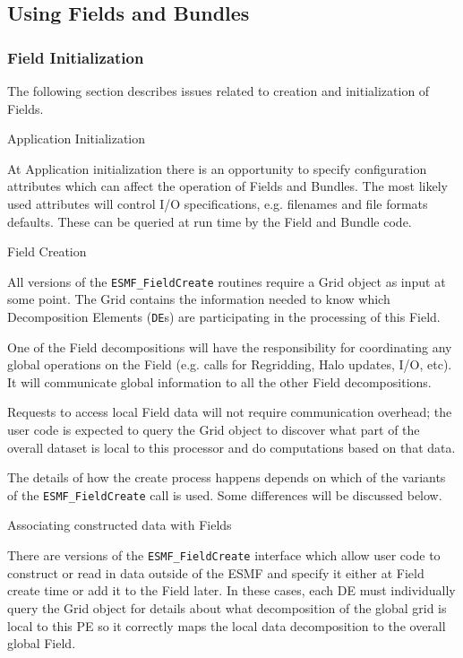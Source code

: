 \subsection{Using Fields and Bundles}

\subsubsection{Field Initialization}

The following section describes issues related to
creation and initialization of Fields.

\begin{description}

\item{Application Initialization}
 
At Application initialization there is an opportunity to 
specify configuration attributes which can affect the
operation of Fields and Bundles.  The most likely used
attributes will control I/O specifications, e.g. 
filenames and file formats defaults.  These can be
queried at run time by the Field and Bundle code.

\item{Field Creation}

All versions of the {\tt ESMF\_FieldCreate} 
routines require a Grid object as input at some point.
The Grid contains the information needed to know which 
Decomposition Elements ({\tt DE}s) are participating in 
the processing of this Field.  

One of the Field decompositions
will have the responsibility for coordinating
any global operations on the Field (e.g. calls for Regridding,
Halo updates, I/O, etc).  It will communicate global information
to all the other Field decompositions.

Requests to access local Field data will not require 
communication overhead; the user code is expected to
query the Grid object to discover what part of the
overall dataset is local to this processor and do
computations based on that data.

The details of how the create process happens depends 
on which of the 
variants of the {\tt ESMF\_FieldCreate} call is used.
Some differences will be discussed below.

\item{Associating constructed data with Fields}

There are versions of the {\tt ESMF\_FieldCreate} interface
which allow user code to construct or read in data
outside of the ESMF and specify it either at Field create
time or add it to the Field later.  
In these cases, each DE must individually query the Grid object 
for details about what decomposition of the global grid is local 
to this PE so it correctly maps the local data decomposition
to the overall global Field.


\end{description}
